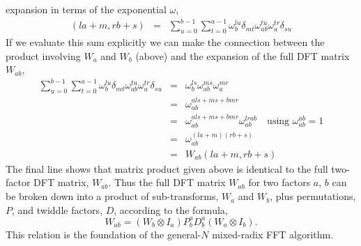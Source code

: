 \documentclass[fleqn,12pt]{article}
\begin{document}
expansion in terms of the exponential $\omega$,
%
\begin{eqnarray}
[(W_b \otimes I_a) P^a_b D^a_b (W_a \otimes I_b)](la+m,rb+s)
&=&
\sum_{u=0}^{b-1} \sum_{t=0}^{a-1}
\omega_b^{lu} \delta_{mt} \omega^{tu}_{ab} \omega^{tr}_{a} \delta_{su}
\end{eqnarray}
%
If we evaluate this sum explicitly we can make the connection between
the product involving $W_a$ and $W_b$ (above) and the expansion of the
full DFT matrix $W_{ab}$,
%
\begin{eqnarray}
\sum_{u=0}^{b-1} \sum_{t=0}^{a-1}
\omega_b^{lu} \delta_{mt} \omega^{tu}_{ab} \omega^{tr}_{a} \delta_{su} 
&=& \omega^{ls}_b \omega^{ms}_{ab} \omega^{mr}_a \\
&=& \omega^{als + ms +bmr}_{ab} \\
&=& \omega^{als + ms +bmr}_{ab} \omega^{lrab}_{ab} \quad\mbox{using~} \omega^{ab}_{ab} =1\\
&=& \omega^{(la+m)(rb+s)}_{ab} \\
&=& W_{ab}(la+m,rb+s)
\end{eqnarray}
% 
The final line shows that matrix product given above is identical to
the full two-factor DFT matrix, $W_{ab}$.
%
Thus the full DFT matrix $W_{ab}$ for two factors $a$, $b$ can be
broken down into a product of sub-transforms, $W_a$ and $W_b$, plus
permutations, $P$, and twiddle factors, $D$, according to the formula,
%
\begin{equation}
W_{ab} = (W_b \otimes I_a) P^a_b D^a_b (W_a \otimes I_b).
\end{equation}
%
This relation is the foundation of the general-$N$ mixed-radix FFT algorithm.
\end{document}
